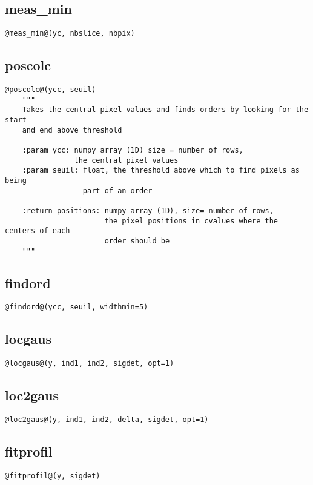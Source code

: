 \subsection{meas\_min}
\begin{lstlisting}[style=pythonstyle]
@meas_min@(yc, nbslice, nbpix)
\end{lstlisting}

\subsection{poscolc}
\begin{lstlisting}[style=pythonstyle]
@poscolc@(ycc, seuil)
    """
    Takes the central pixel values and finds orders by looking for the start
    and end above threshold
    
    :param ycc: numpy array (1D) size = number of rows, 
                the central pixel values
    :param seuil: float, the threshold above which to find pixels as being
                  part of an order
                      
    :return positions: numpy array (1D), size= number of rows,
                       the pixel positions in cvalues where the centers of each
                       order should be 
    """
\end{lstlisting}

\subsection{findord}
\begin{lstlisting}[style=pythonstyle]
@findord@(ycc, seuil, widthmin=5)
\end{lstlisting}

\subsection{locgaus}
\begin{lstlisting}[style=pythonstyle]
@locgaus@(y, ind1, ind2, sigdet, opt=1)
\end{lstlisting}

\subsection{loc2gaus}
\begin{lstlisting}[style=pythonstyle]
@loc2gaus@(y, ind1, ind2, delta, sigdet, opt=1)
\end{lstlisting}

\subsection{fitprofil}
\begin{lstlisting}[style=pythonstyle]
@fitprofil@(y, sigdet)
\end{lstlisting}

